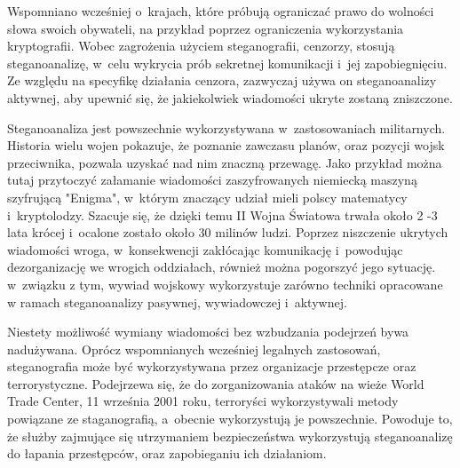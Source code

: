 \documentclass[a4paper, twoside, 12pt]{report}
\begin{document}
        Wspomniano wcześniej o~krajach, które próbują ograniczać
        prawo do wolności słowa swoich obywateli, na przykład poprzez ograniczenia
        wykorzystania kryptografii. Wobec zagrożenia użyciem steganografii, cenzorzy,
        stosują steganoanalizę, w~celu wykrycia prób sekretnej komunikacji i~jej zapobiegnięciu.
        Ze względu na specyfikę działania cenzora, zazwyczaj używa on steganoanalizy
        aktywnej, aby upewnić się, że jakiekolwiek wiadomości ukryte zostaną zniszczone.

        Steganoanaliza jest powszechnie wykorzystywana w~zastosowaniach militarnych.
        Historia wielu wojen pokazuje, że poznanie zawczasu planów, oraz pozycji
        wojsk przeciwnika, pozwala uzyskać nad nim znaczną przewagę. Jako przykład
        można tutaj przytoczyć załamanie wiadomości zaszyfrowanych niemiecką maszyną
        szyfrującą "Enigma", w~którym znaczący udział mieli polscy matematycy i~kryptolodzy.
        Szacuje się, że dzięki temu II Wojna Światowa trwała około 2 -3 lata krócej
        i~ocalone zostało około 30 milinów ludzi. Poprzez niszczenie ukrytych wiadomości wroga,
        w~konsekwencji zakłócając komunikację i~powodując dezorganizację we wrogich oddziałach,
        również można pogorszyć jego sytuację.
        w~związku z tym, wywiad wojskowy wykorzystuje zarówno techniki opracowane w
        ramach steganoanalizy pasywnej, wywiadowczej i~aktywnej.

        Niestety możliwość wymiany wiadomości bez wzbudzania podejrzeń bywa nadużywana.
        Oprócz wspomnianych wcześniej legalnych zastosowań, steganografia może
        być wykorzystywana przez organizacje przestępcze oraz terrorystyczne. Podejrzewa
        się, że do zorganizowania ataków na wieże World Trade Center, 11 września 2001 roku,
        terroryści wykorzystywali metody powiązane ze staganografią, a~obecnie wykorzystują
        je powszechnie\cite{TERRORISMANDSTEGANOGRAPHY}.
        Powoduje to, że służby zajmujące się utrzymaniem bezpieczeństwa wykorzystują
        steganoanalizę do łapania przestępców, oraz zapobieganiu ich działaniom.
\end{document}
